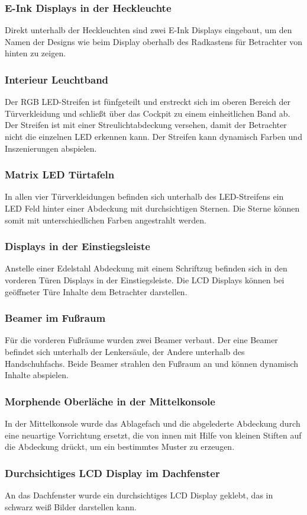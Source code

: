 \subsubsection{E-Ink Displays in der Heckleuchte}
Direkt unterhalb der Heckleuchten sind zwei E-Ink Displays eingebaut, um den Namen der Designs wie beim Display oberhalb des Radkastens für Betrachter von hinten zu zeigen.
\subsubsection{Interieur Leuchtband}
Der RGB LED-Streifen ist fünfgeteilt und erstreckt sich im oberen Bereich der Türverkleidung und schließt über das Cockpit zu einem einheitlichen Band ab. Der Streifen ist mit einer Streulichtabdeckung versehen, damit der Betrachter nicht die einzelnen LED erkennen kann. Der Streifen kann dynamisch Farben und Inszenierungen abspielen.
\subsubsection{Matrix LED Türtafeln}
In allen vier Türverkleidungen befinden sich unterhalb des LED-Streifens ein LED Feld hinter einer Abdeckung mit durchsichtigen Sternen. Die Sterne können somit mit unterschiedlichen Farben angestrahlt werden. 
\subsubsection{Displays in der Einstiegsleiste}
Anstelle einer Edelstahl Abdeckung mit einem Schriftzug befinden sich in den vorderen Türen Displays in der Einstiegsleiste. Die LCD Displays können bei geöffneter Türe Inhalte dem Betrachter darstellen.
\subsubsection{Beamer im Fußraum}
Für die vorderen Fußräume wurden zwei Beamer verbaut. Der eine Beamer befindet sich unterhalb der Lenkersäule, der Andere unterhalb des Handschuhfachs. Beide Beamer strahlen den Fußraum an und können dynamisch Inhalte abspielen.
\subsubsection{Morphende Oberläche in der Mittelkonsole}
In der Mittelkonsole wurde das Ablagefach und die abgelederte Abdeckung durch eine neuartige Vorrichtung ersetzt, die von innen mit Hilfe von kleinen Stiften auf die Abdeckung drückt, um ein bestimmtes Muster zu erzeugen.
\subsubsection{Durchsichtiges LCD Display im Dachfenster}
An das Dachfenster wurde ein durchsichtiges LCD Display geklebt, das in schwarz weiß Bilder darstellen kann.
